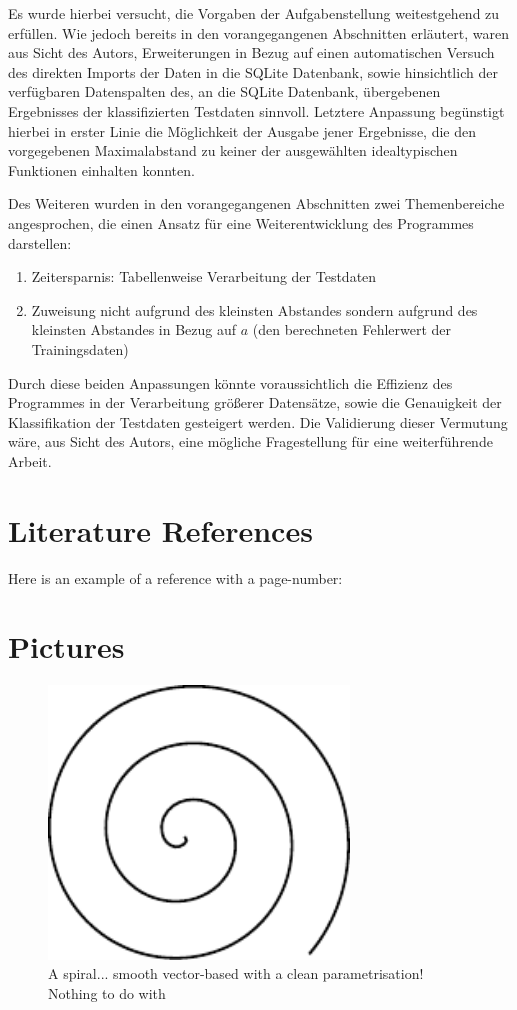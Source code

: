 Es wurde hierbei versucht, die Vorgaben der Aufgabenstellung weitestgehend zu erfüllen. Wie jedoch bereits in den vorangegangenen Abschnitten erläutert, waren aus Sicht des Autors, Erweiterungen in Bezug auf einen automatischen Versuch des direkten Imports der Daten in die SQLite Datenbank, sowie hinsichtlich der verfügbaren Datenspalten des, an die SQLite Datenbank, übergebenen Ergebnisses der klassifizierten Testdaten sinnvoll. Letztere Anpassung begünstigt hierbei in erster Linie die Möglichkeit der Ausgabe jener Ergebnisse, die den vorgegebenen Maximalabstand zu keiner der ausgewählten idealtypischen Funktionen einhalten konnten.

Des Weiteren wurden in den vorangegangenen Abschnitten zwei Themenbereiche angesprochen, die einen Ansatz für eine Weiterentwicklung des Programmes darstellen:

\begin{enumerate}
 \itemsep0pt
 \item Zeitersparnis: Tabellenweise Verarbeitung der Testdaten
 \item Zuweisung nicht aufgrund des kleinsten Abstandes sondern aufgrund des kleinsten Abstandes in Bezug auf $a$ (den berechneten Fehlerwert der Trainingsdaten)
\end{enumerate}

Durch diese beiden Anpassungen könnte voraussichtlich die Effizienz des Programmes in der Verarbeitung größerer Datensätze, sowie die Genauigkeit der Klassifikation der Testdaten gesteigert werden. Die Validierung dieser Vermutung wäre, aus Sicht des Autors, eine mögliche Fragestellung für eine weiterführende Arbeit. 


\section{Literature References}
Here is an example of a reference with a page-number: \cite[S. 6]{DueckKo:2016}


\section{Pictures}

\begin{figure}[h]
\centering
\includegraphics[width=8cm]{pics/spiral.pdf}
\caption{A spiral... smooth vector-based with a clean parametrisation! \\ Nothing to do with \cite{Gage:18}}\label{fig:spiral}
\end{figure}
\FloatBarrier

